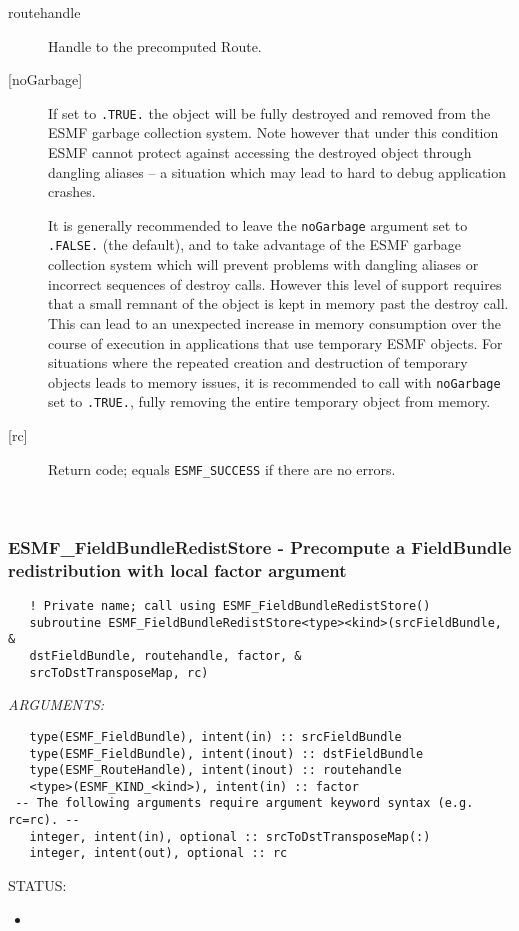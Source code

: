    \begin{description}
   \item [routehandle]
   Handle to the precomputed Route.
   \item[{[noGarbage]}]
   If set to {\tt .TRUE.} the object will be fully destroyed and removed
   from the ESMF garbage collection system. Note however that under this
   condition ESMF cannot protect against accessing the destroyed object
   through dangling aliases -- a situation which may lead to hard to debug
   application crashes.
  
   It is generally recommended to leave the {\tt noGarbage} argument
   set to {\tt .FALSE.} (the default), and to take advantage of the ESMF
   garbage collection system which will prevent problems with dangling
   aliases or incorrect sequences of destroy calls. However this level of
   support requires that a small remnant of the object is kept in memory
   past the destroy call. This can lead to an unexpected increase in memory
   consumption over the course of execution in applications that use
   temporary ESMF objects. For situations where the repeated creation and
   destruction of temporary objects leads to memory issues, it is
   recommended to call with {\tt noGarbage} set to {\tt .TRUE.}, fully
   removing the entire temporary object from memory.
   \item [{[rc]}]
   Return code; equals {\tt ESMF\_SUCCESS} if there are no errors.
   \end{description}
   
 
\mbox{}\hrulefill\ 
 
\subsubsection [ESMF\_FieldBundleRedistStore] {ESMF\_FieldBundleRedistStore - Precompute a FieldBundle redistribution with local factor argument}


  
\begin{verbatim}   ! Private name; call using ESMF_FieldBundleRedistStore()
   subroutine ESMF_FieldBundleRedistStore<type><kind>(srcFieldBundle, &
   dstFieldBundle, routehandle, factor, &
   srcToDstTransposeMap, rc)\end{verbatim}{\em ARGUMENTS:}
\begin{verbatim}   type(ESMF_FieldBundle), intent(in) :: srcFieldBundle
   type(ESMF_FieldBundle), intent(inout) :: dstFieldBundle
   type(ESMF_RouteHandle), intent(inout) :: routehandle
   <type>(ESMF_KIND_<kind>), intent(in) :: factor
 -- The following arguments require argument keyword syntax (e.g. rc=rc). --
   integer, intent(in), optional :: srcToDstTransposeMap(:)
   integer, intent(out), optional :: rc\end{verbatim}
{\sf STATUS:}
   \begin{itemize}
   \item{}
   \end{itemize}
  
